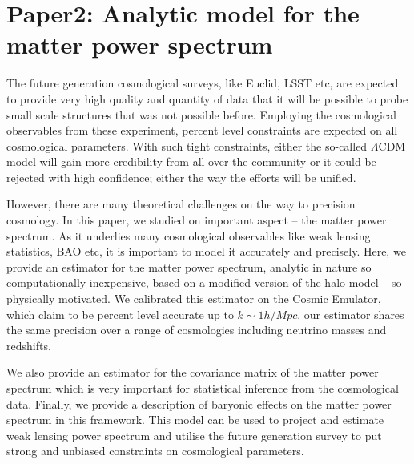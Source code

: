 \chapter{Paper2: Analytic model for the matter power spectrum}\label{paper:analyticmodel}

The future generation cosmological surveys, like Euclid, LSST etc, are expected to provide
very high quality and quantity of data that it will be possible to probe small scale structures
that was not possible before. Employing the cosmological observables from these experiment, 
percent level constraints are expected on all cosmological parameters. With such tight
constraints, either the so-called $\Lambda$CDM model will gain more credibility
from all over the community or it could be rejected with high confidence; either the 
way the efforts will be unified. 

However, there are many theoretical challenges on the way to precision cosmology. In this
paper, we studied on important aspect -- the matter power spectrum. As it underlies
many cosmological observables like weak lensing statistics, BAO etc, it is important
to model it accurately and precisely. Here, we provide an estimator for the matter
power spectrum, analytic in nature so computationally inexpensive, based 
on a modified version of the halo model -- so physically motivated. We calibrated
this estimator on  the Cosmic Emulator, which claim to be percent 
level accurate up to $k\sim 1 h/Mpc$, our estimator shares the same precision
over a range of cosmologies including neutrino masses and redshifts. 

We also provide an estimator for the covariance matrix of the matter power
spectrum which is very important for statistical inference from the cosmological
data. Finally, we provide a description of baryonic effects on the matter
power spectrum in this framework. This model can be used to project and estimate
weak lensing power spectrum and utilise the future generation survey
to put strong and unbiased constraints on cosmological parameters.


\clearpage
